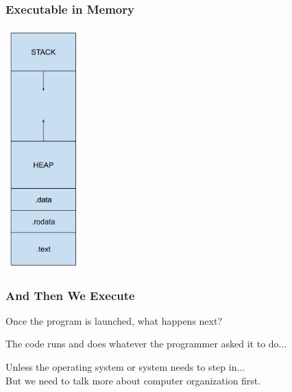 \begin{frame}
\frametitle{Executable in Memory}

\begin{center}
  \includegraphics[width=0.22\textwidth]{images/program-in-mem.png}
\end{center}

\end{frame}

\begin{frame}
\frametitle{And Then We Execute}

Once the program is launched, what happens next?

The code runs and does whatever the programmer asked it to do...

Unless the operating system or system needs to step in...\\
\quad But we need to talk more about computer organization first.

\end{frame}



